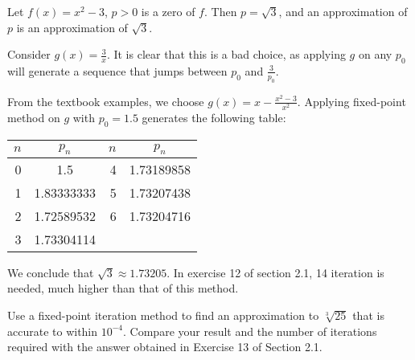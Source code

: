 \documentclass[../../../../Assignments]{subfiles}
\begin{document}
\begin{solution}
    Let \(f(x) = x^2 - 3\), \(p > 0\) is a zero of \(f\). Then \(p = \sqrt{3}\),
    and an approximation of \(p\) is an approximation of \(\sqrt{3}\).

    Consider \(g(x) = \frac{3}{x}\). It is clear that this is a bad choice, as
    applying \(g\) on any \(p_0\) will generate a sequence that jumps between
    \(p_0\) and \(\frac{3}{p_0}\).

    From the textbook examples, we choose \(g(x) = x - \frac{x^2 - 3}{x^2}\).
    Applying fixed-point method on \(g\) with \(p_0 = \num{1.5}\) generates the
    following table:

    \begin{table}[H]
        \centering
        \begin{tabular}{r S[table-format=1.8] r S[table-format=1.8]}
            \toprule
            \(n\)  &   {\(p_n\)}   &  \(n\)  &   {\(p_n\)}   \\
              &  1.5          &      4  &  1.73189858   \\
                1  &  1.83333333   &      5  &  1.73207438   \\
                2  &  1.72589532   &      6  &  1.73204716   \\
                3  &  1.73304114   &         &               \\
            \bottomrule
        \end{tabular}
    \end{table}

    We conclude that \(\sqrt{3} \approx \num{1.73205}\). In exercise 12 of
    section 2.1, 14 iteration is needed, much higher than that of this method.
\end{solution}

\begin{exercise}
    Use a fixed-point iteration method to find an approximation to
    \(\sqrt[3]{25}\) that is accurate to within \(10^{-4}\). Compare your result
    and the number of iterations required with the answer obtained in Exercise
    13 of Section 2.1.
\end{exercise}
\end{document}

